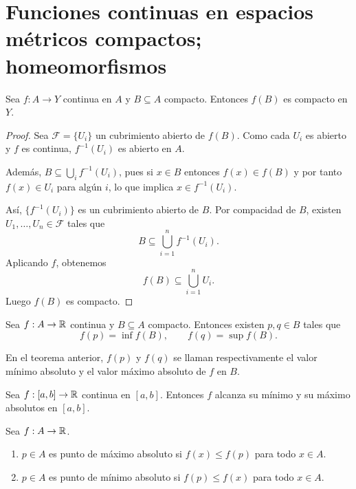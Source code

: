 \section{Funciones continuas en espacios métricos compactos; homeomorfismos}

\begin{teorema}
Sea $f:A\to Y$ continua en $A$ y $B\subseteq A$ compacto.
Entonces $f(B)$ es compacto en $Y$.
\end{teorema}

\begin{proof}
Sea $\mathcal{F}=\{U_i\}$ un cubrimiento abierto de $f(B)$.
Como cada $U_i$ es abierto y $f$ es continua, $f^{-1}(U_i)$ es abierto en $A$.

Además, $B\subseteq\bigcup_i f^{-1}(U_i)$, pues si $x\in B$ entonces $f(x)\in f(B)$ y por tanto $f(x)\in U_i$ para algún $i$, lo que implica $x\in f^{-1}(U_i)$.

Así, $\{f^{-1}(U_i)\}$ es un cubrimiento abierto de $B$.
Por compacidad de $B$, existen $U_1,\dots,U_n\in\mathcal{F}$ tales que
\[
B\subseteq\bigcup_{i=1}^n f^{-1}(U_i).
\]
Aplicando $f$, obtenemos
\[
f(B)\subseteq\bigcup_{i=1}^n U_i.
\]
Luego $f(B)$ es compacto.
\end{proof}

\begin{teorema}
Sea $f:A\to\mathbb{R}$ continua y $B\subseteq A$ compacto.
Entonces existen $p,q\in B$ tales que
\[
f(p)=\inf f(B),
\qquad
f(q)=\sup f(B).
\]
\end{teorema}

\begin{remark}
En el teorema anterior, $f(p)$ y $f(q)$ se llaman respectivamente el valor mínimo absoluto y el valor máximo absoluto de $f$ en $B$.
\end{remark}

\begin{teorema}
Sea $f:[a,b]\to\mathbb{R}$ continua en $[a,b]$.
Entonces $f$ alcanza su mínimo y su máximo absolutos en $[a,b]$.
\end{teorema}

\begin{definicion}
Sea $f:A\to\mathbb{R}$.
\begin{enumerate}
    \item $p\in A$ es punto de máximo absoluto si $f(x)\le f(p)$ para todo $x\in A$.
    \item $p\in A$ es punto de mínimo absoluto si $f(p)\le f(x)$ para todo $x\in A$.
\end{enumerate}
\end{definicion}

